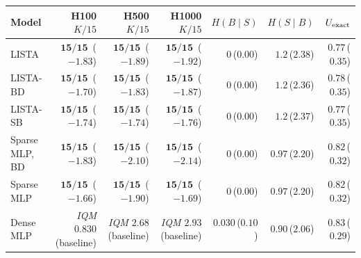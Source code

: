 \begin{tabular}{@{}l rrr rrr@{}}
\toprule
Model & H100 $K/15$ & H500 $K/15$ & H1000 $K/15$ & $H(B\!\mid\!S)$ & $H(S\!\mid\!B)$ & $U_{\rm exact}$ \\
\midrule
LISTA & $\mathbf{15/15}$\, ($-1.83$) & $\mathbf{15/15}$\, ($-1.89$) & $\mathbf{15/15}$\, ($-1.92$) & $0$\,($0.00$) & $1.2$\,($2.38$) & $0.77$\,($0.35$) \\
LISTA-BD & $\mathbf{15/15}$\, ($-1.70$) & $\mathbf{15/15}$\, ($-1.83$) & $\mathbf{15/15}$\, ($-1.87$) & $0$\,($0.00$) & $1.2$\,($2.36$) & $0.78$\,($0.35$) \\
LISTA-SB & $\mathbf{15/15}$\, ($-1.74$) & $\mathbf{15/15}$\, ($-1.74$) & $\mathbf{15/15}$\, ($-1.76$) & $0$\,($0.00$) & $1.2$\,($2.37$) & $0.77$\,($0.35$) \\
Sparse MLP, BD & $\mathbf{15/15}$\, ($-1.83$) & $\mathbf{15/15}$\, ($-2.10$) & $\mathbf{15/15}$\, ($-2.14$) & $0$\,($0.00$) & $0.97$\,($2.20$) & $0.82$\,($0.32$) \\
Sparse MLP & $\mathbf{15/15}$\, ($-1.66$) & $\mathbf{15/15}$\, ($-1.90$) & $\mathbf{15/15}$\, ($-1.69$) & $0$\,($0.00$) & $0.97$\,($2.20$) & $0.82$\,($0.32$) \\
Dense MLP & \emph{IQM $0.830$} (baseline) & \emph{IQM $2.68$} (baseline) & \emph{IQM $2.93$} (baseline) & $0.030$\,($0.10$) & $0.90$\,($2.06$) & $0.83$\,($0.29$) \\
\bottomrule
\end{tabular}
